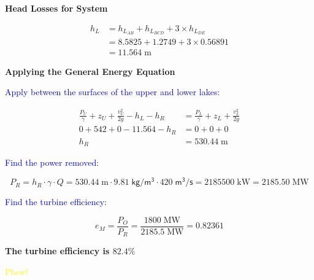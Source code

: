 \documentclass[10pt]{amsart}
\begin{document}
\textbf{Head Losses for System}

\begin{align*}
	h_L & = h_{L_{AB}}+h_{L_{BCD}}+3\times h_{L_{DE}} \\
	    & = 8.5825+1.2749+3\times0.56891              \\
	    & = 11.564\;\text{m}                          
\end{align*}

\textbf{Applying the General Energy Equation}

\textcolor{blue}{Apply between the surfaces of the upper and lower lakes}:

\begin{align*}
	\frac{P_U}{\gamma}+z_U+\frac{v_U^2}{2g}-h_L-h_R & = \frac{P_L}{\gamma}+z_L+\frac{v_L^2}{2g} \\
	0+542+0-11.564-h_R                              & = 0+0+0                                   \\
	h_R                                             & = 530.44\;\text{m}                        
\end{align*}

\textcolor{blue}{Find the power removed}:

\[ P_R = h_R \cdot \gamma \cdot Q = 530.44\; \text{m}\cdot9.81\; \mathsf{kg/m^3}\cdot420\; \mathsf{m^3/s} =
	2185500\;\text{kW}=2185.50\;\text{MW}\]
	
	\textcolor{blue}{Find the turbine efficiency}:
	
	\[ e_M = \frac{P_O}{P_R} = \frac{1800\;\text{MW}}{2185.5\;\text{MW}}= 0.82361 \]
	
	\begin{center}
		\textbf{The turbine efficiency is $82.4\%$}
	\end{center}
	
	\textcolor{yellow}{Phew!}
	
	
	
	
	
	\vfill
	
	
	\newpage
	
	
	
\end{document}
